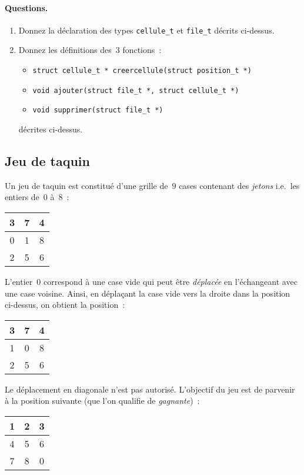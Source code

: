 \paragraph{Questions.}
\begin{enumerate}
\item Donnez la d\'eclaration des types \texttt{cellule\_t} et
  \texttt{file\_t} d\'ecrits ci-dessus.
\item Donnez les d\'efinitions des~$3$ fonctions~:
  \begin{itemize}
  \item \verb?struct cellule_t * creercellule(struct position_t *)?
  \item \verb?void ajouter(struct file_t *, struct cellule_t *)? 
  \item \verb?void supprimer(struct file_t *)?
  \end{itemize}
  d\'ecrites ci-dessus.
\end{enumerate}

\subsection{Jeu de taquin}
\label{sec:taquin}
Un jeu de taquin est constitu\'e d'une grille de~$9$ cases contenant
des \textit{jetons} i.e.\ les entiers de~$0$ \`a~$8$~:
\begin{center}
  \begin{tabular}{|c|c|c|}
    \hline
    3 & 7 & 4 \\ \hline 
    0 & 1 & 8 \\ \hline 
    2 & 5 & 6 \\ \hline 
  \end{tabular}
\end{center}
L'entier~$0$ correspond \`a une case vide qui peut \^etre
\textit{d\'eplac\'ee} en l'\'echangeant avec une case voisine. Ainsi,
en d\'epla\c{c}ant la case vide vers la droite dans la position
ci-dessus, on obtient la position~:
\begin{center}
  \begin{tabular}{|c|c|c|}
    \hline
    3 & 7 & 4 \\ \hline 
    1 & 0 & 8 \\ \hline 
    2 & 5 & 6 \\ \hline 
  \end{tabular}
\end{center}
Le d\'eplacement en diagonale n'est pas autoris\'e.  L'objectif du jeu
est de parvenir \`a la position suivante (que l'on qualifie de
\textit{gagnante})~:
\begin{center}
  \begin{tabular}{|c|c|c|}
    \hline
    1 & 2 & 3 \\ \hline 
    4 & 5 & 6 \\ \hline 
    7 & 8 & 0 \\ \hline 
  \end{tabular}
\end{center}
